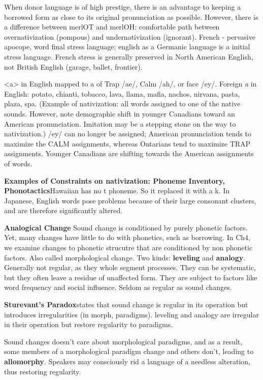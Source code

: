 \documentclass{exam}
\begin{document}
When donor language is of high prestige, there is an advantage to keeping a borrowed form as close to its original pronunciation as possible. However, there is a difference between merlOT and merlOH: comfortable path between overnativization (pompous) and undernativization (ignorant). 
French - pervasive apocope, word final stress language; english as a Germanic language is a initial stress language. French stress is generally preserved in North American English, not British English (garage, ballet, frontier). 

<a> in English mapped to a of Trap /ae/, Calm /ah/, or face /ey/. Foreign \textit{a} in English: potato, chianti, tobacco, lava, llama, mafia, nachos, nirvana, pasta, plaza, spa. (Example of nativization: all words assigned to one of the native sounds. However, note demographic shift in younger Canadians toward an American pronunciation. Imitation may be a stepping stone on the way to nativization.)  /ey/ can no longer be assigned; American pronunciation tends to maximize the CALM assignments, whereas Ontarians tend to maximize TRAP assignments. Younger Canadians are shifting towards the American assignments of words. 

\textbf{Examples of Constraints on nativization: Phoneme Inventory, Phonotactics}Hawaiian has no t phoneme. So it replaced it with a k. In Japanese, English words pose problems because of their large consonant clusters, and are therefore significantly altered.

\textbf{Analogical Change}  Sound change is conditioned by purely phonetic factors. Yet, many changes have little to do with phonetics, such as borrowing. In Ch4, we examine changes to phonetic strucutre that are conditioned by non phonetic factors. Also called morphological change. Two kinds: \textbf{leveling} and \textbf{analogy}. Generally not regular, as they whole segment processes. They can be systematic, but they often leave a residue of unaffected form. They are subject to factors like word frequency and social influence. Seldom as regular as sound changes. 

\textbf{Sturevant's Paradox}states that sound change is regular in its operation but introduces irregularities (in morph, paradigms). leveling and analogy are irregular in their operation but restore regularity to paradigms. 


Sound changes doesn't care about morphological paradigms, and as a result, some members of a morphological paradigm change and others don't, leading to \textbf{allomorphy}. Speakers may consciously rid a language of a needless alteration, thus restoring regularity.
\end{document}
